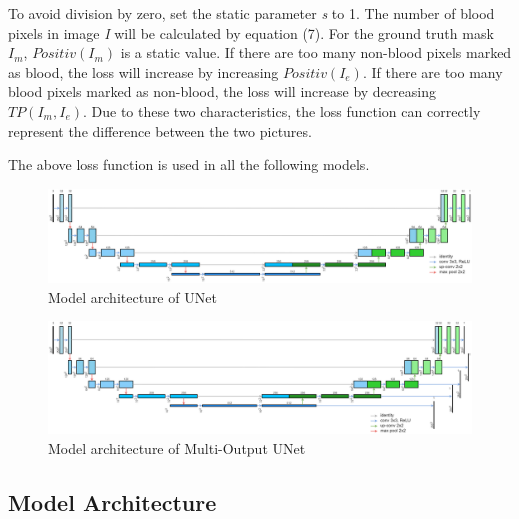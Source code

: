 \documentclass[10pt,journal,compsoc]{IEEEtran}
\begin{document}
To avoid division by zero, set the static parameter \textit{s} to 1.
The number of blood pixels in image \textit{I} will be calculated by equation (7).
For the ground truth mask \textit{$I_m$}, \textit{$Positiv(I_m)$} is a static value.
If there are too many non-blood pixels marked as blood, the loss will increase by increasing \textit{$Positiv(I_e)$}.
If there are too many blood pixels marked as non-blood, the loss will increase by decreasing \textit{$TP(I_m, I_e)$}.
Due to these two characteristics, the loss function can correctly represent the difference between the two pictures.
\par
The above loss function is used in all the following models.

\begin{figure}[t]
  \centering
  \includegraphics[width=\linewidth]{img/model_UNet.png}
  \caption{Model architecture of UNet}
  \label{fig:unet}
\end{figure}

\begin{figure}[t]
  \centering
  \includegraphics[width=\linewidth]{img/model_MultiUNet.png}
  \caption{Model architecture of Multi-Output UNet}
  \label{fig:multiOutUnet}
\end{figure}

\subsection{Model Architecture}
\end{document}
